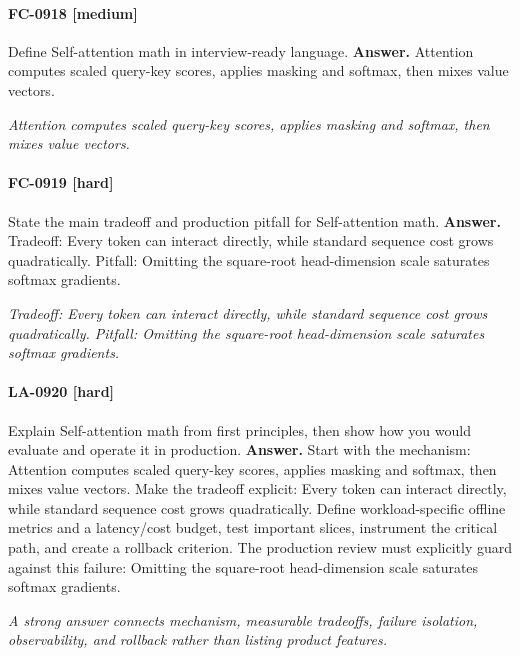 \paragraph{FC-0918 [medium]} Define Self-attention math in interview-ready language.
\noindent\textbf{Answer.} Attention computes scaled query-key scores, applies masking and softmax, then mixes value vectors.
\par\textit{Attention computes scaled query-key scores, applies masking and softmax, then mixes value vectors.}
\paragraph{FC-0919 [hard]} State the main tradeoff and production pitfall for Self-attention math.
\noindent\textbf{Answer.} Tradeoff: Every token can interact directly, while standard sequence cost grows quadratically. Pitfall: Omitting the square-root head-dimension scale saturates softmax gradients.
\par\textit{Tradeoff: Every token can interact directly, while standard sequence cost grows quadratically. Pitfall: Omitting the square-root head-dimension scale saturates softmax gradients.}
\paragraph{LA-0920 [hard]} Explain Self-attention math from first principles, then show how you would evaluate and operate it in production.
\noindent\textbf{Answer.} Start with the mechanism: Attention computes scaled query-key scores, applies masking and softmax, then mixes value vectors. Make the tradeoff explicit: Every token can interact directly, while standard sequence cost grows quadratically. Define workload-specific offline metrics and a latency/cost budget, test important slices, instrument the critical path, and create a rollback criterion. The production review must explicitly guard against this failure: Omitting the square-root head-dimension scale saturates softmax gradients.
\par\textit{A strong answer connects mechanism, measurable tradeoffs, failure isolation, observability, and rollback rather than listing product features.}
